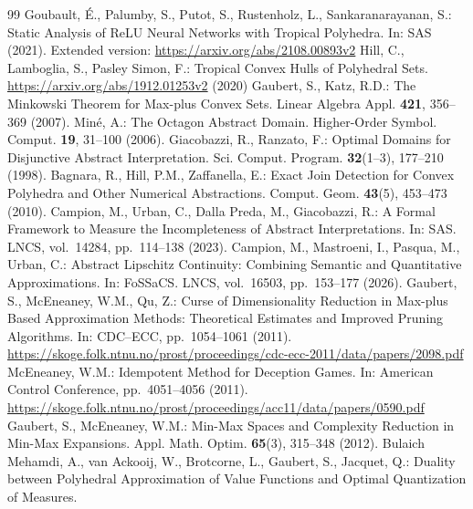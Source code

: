 \begin{thebibliography}{99}
Goubault, \'{E}., Palumby, S., Putot, S., Rustenholz, L., Sankaranarayanan, S.:
Static Analysis of ReLU Neural Networks with Tropical Polyhedra.
In: SAS (2021). Extended version: \url{https://arxiv.org/abs/2108.00893v2}
Hill, C., Lamboglia, S., Pasley Simon, F.:
Tropical Convex Hulls of Polyhedral Sets.
\url{https://arxiv.org/abs/1912.01253v2} (2020)
Gaubert, S., Katz, R.D.: The Minkowski Theorem for Max-plus Convex Sets.
Linear Algebra Appl. \textbf{421}, 356--369 (2007).
Min\'{e}, A.: The Octagon Abstract Domain.
Higher-Order Symbol. Comput. \textbf{19}, 31--100 (2006).
Giacobazzi, R., Ranzato, F.: Optimal Domains for Disjunctive Abstract Interpretation.
Sci. Comput. Program. \textbf{32}(1--3), 177--210 (1998).
Bagnara, R., Hill, P.M., Zaffanella, E.: Exact Join Detection for Convex Polyhedra and Other Numerical Abstractions.
Comput. Geom. \textbf{43}(5), 453--473 (2010).
Campion, M., Urban, C., Dalla Preda, M., Giacobazzi, R.:
A Formal Framework to Measure the Incompleteness of Abstract Interpretations.
In: SAS. LNCS, vol.~14284, pp.~114--138 (2023).
Campion, M., Mastroeni, I., Pasqua, M., Urban, C.:
Abstract Lipschitz Continuity: Combining Semantic and Quantitative Approximations.
In: FoSSaCS. LNCS, vol.~16503, pp.~153--177 (2026).
Gaubert, S., McEneaney, W.M., Qu, Z.: Curse of Dimensionality Reduction in Max-plus Based Approximation Methods: Theoretical Estimates and Improved Pruning Algorithms.
In: CDC--ECC, pp.~1054--1061 (2011).
\url{https://skoge.folk.ntnu.no/prost/proceedings/cdc-ecc-2011/data/papers/2098.pdf}
McEneaney, W.M.: Idempotent Method for Deception Games.
In: American Control Conference, pp.~4051--4056 (2011).
\url{https://skoge.folk.ntnu.no/prost/proceedings/acc11/data/papers/0590.pdf}
Gaubert, S., McEneaney, W.M.: Min-Max Spaces and Complexity Reduction in Min-Max Expansions.
Appl. Math. Optim. \textbf{65}(3), 315--348 (2012).
Bulaich Mehamdi, A., van Ackooij, W., Brotcorne, L., Gaubert, S., Jacquet, Q.:
Duality between Polyhedral Approximation of Value Functions and Optimal Quantization of Measures.

\end{thebibliography}
